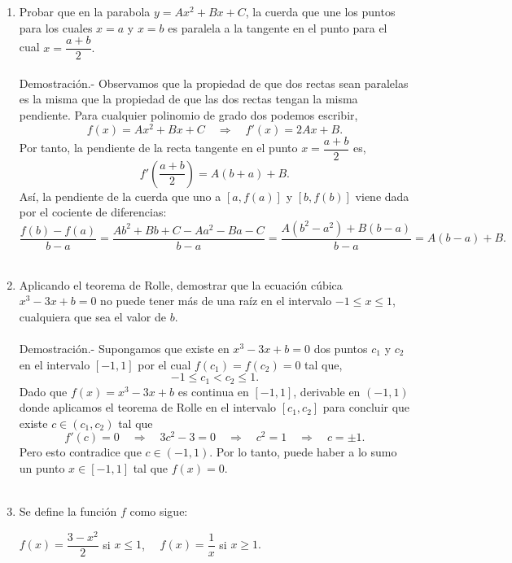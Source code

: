 \begin{enumerate}[\bfseries 1.]

    \item Probar que en la parabola $y=Ax^2+Bx + C$, la cuerda que une los puntos para los cuales $x=a$ y $x=b$ es paralela a la tangente en el punto para el cual $x=\dfrac{a+b}{2}.$\\\\
	Demostración.-\; Observamos que la propiedad de que dos rectas sean paralelas es la misma que la propiedad de que las dos rectas tengan la misma pendiente. Para cualquier polinomio de grado dos podemos escribir,
	$$f(x)=Ax^2+Bx+C \quad \Rightarrow \quad f'(x)=2Ax+B.$$
	Por tanto, la pendiente de la recta tangente en el punto $x=\dfrac{a+b}{2}$ es,
	$$f'\left(\dfrac{a+b}{2}\right)=A(b+a)+B.$$
	Así, la pendiente de la cuerda que uno a $\left[a,f(a)\right]$ y $\left[b,f(b)\right]$ viene dada por el cociente de diferencias:
	$$\dfrac{f(b)-f(a)}{b-a}=\dfrac{Ab^2+Bb+C-Aa^2-Ba-C}{b-a}=\dfrac{A\left(b^2-a^2\right)+B(b-a)}{b-a}=A(b-a)+B.$$\\
 
    \item Aplicando el teorema de Rolle, demostrar que la ecuación cúbica $x^3-3x+b=0$ no puede tener más de una raíz en el intervalo $-1\leq x\leq 1$, cualquiera que sea el valor de $b$.\\\\
	Demostración.-\; Supongamos que existe en $x^3-3x+b=0$ dos puntos $c_1$ y $c_2$ en el intervalo $[-1,1]$ por el cual $f(c_1)=f(c_2)=0$ tal que,
	$$-1\leq c_1 < c_2 \leq 1.$$
	Dado que $f(x)=x^3-3x+b$ es continua en $[-1,1]$, derivable en $(-1,1)$ donde aplicamos el teorema de Rolle en el intervalo $[c_1,c_2]$ para concluir que existe $c\in(c_1,c_2)$ tal que
	$$f'(c)=0\quad \Rightarrow \quad 3c^2-3=0 \quad \Rightarrow \quad c^2=1 \quad \Rightarrow \quad c=\pm 1.$$
	Pero esto contradice que $c\in (-1,1)$. Por lo tanto, puede haber a lo sumo un punto $x\in [-1,1]$ tal que $f(x)=0.$\\\\

    \item Se define la función $f$ como sigue:
	\begin{center}
	    $f(x)=\dfrac{3-x^2}{2}$ si $x\leq 1$, $\quad f(x)=\dfrac{1}{x}$ si $x\geq 1.$
	\end{center}

	\begin{enumerate}[(a)]


\end{enumerate}
\end{enumerate}
